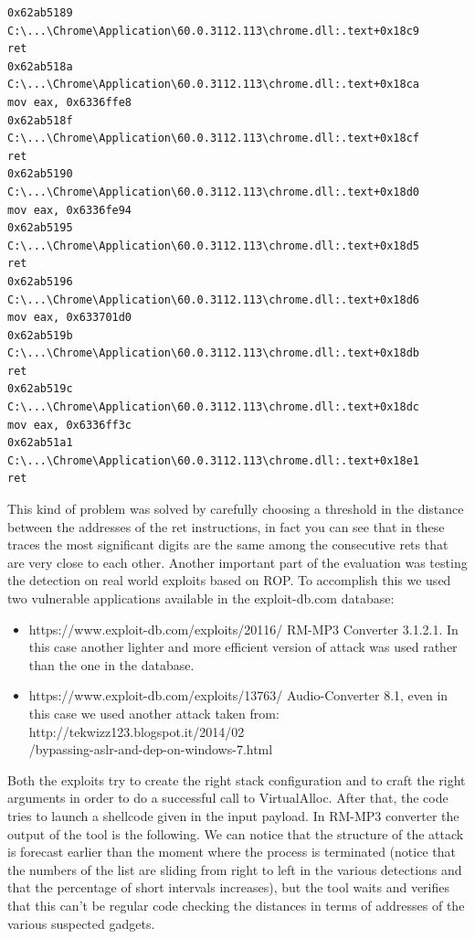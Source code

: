 \documentclass[Lau,binding=0.6cm]{sapthesis}
\begin{document}
\begin{verbatim}
0x62ab5189 C:\...\Chrome\Application\60.0.3112.113\chrome.dll:.text+0x18c9        ret 
0x62ab518a C:\...\Chrome\Application\60.0.3112.113\chrome.dll:.text+0x18ca        mov eax, 0x6336ffe8
0x62ab518f C:\...\Chrome\Application\60.0.3112.113\chrome.dll:.text+0x18cf        ret 
0x62ab5190 C:\...\Chrome\Application\60.0.3112.113\chrome.dll:.text+0x18d0        mov eax, 0x6336fe94
0x62ab5195 C:\...\Chrome\Application\60.0.3112.113\chrome.dll:.text+0x18d5        ret 
0x62ab5196 C:\...\Chrome\Application\60.0.3112.113\chrome.dll:.text+0x18d6        mov eax, 0x633701d0
0x62ab519b C:\...\Chrome\Application\60.0.3112.113\chrome.dll:.text+0x18db        ret 
0x62ab519c C:\...\Chrome\Application\60.0.3112.113\chrome.dll:.text+0x18dc        mov eax, 0x6336ff3c
0x62ab51a1 C:\...\Chrome\Application\60.0.3112.113\chrome.dll:.text+0x18e1        ret 

\end{verbatim}
\endgroup

This kind of problem was solved by carefully choosing a threshold in the distance between the addresses of the ret instructions, in fact you can see that in these traces the most significant digits are the same among the consecutive rets that are very close to each other.
Another important part of the evaluation was testing the detection on real world exploits based on ROP. To accomplish this we used two vulnerable applications available in the exploit-db.com database:
\begin{itemize}
\item
https://www.exploit-db.com/exploits/20116/ RM-MP3 Converter 3.1.2.1. In this case another lighter and more efficient version of attack was used rather than the one in the database.
\item
https://www.exploit-db.com/exploits/13763/ Audio-Converter 8.1, even in this case we used another attack taken from: http://tekwizz123.blogspot.it/2014/02\\ /bypassing-aslr-and-dep-on-windows-7.html
\end{itemize}
Both the exploits try to create the right stack configuration and to craft the right arguments in order to do a successful call to VirtualAlloc. After that, the code tries to launch a shellcode given in the input payload. 
In RM-MP3 converter the output of the tool is the following. We can notice that the structure of the attack is forecast earlier than the moment where the process is terminated (notice that the numbers of the list are sliding from right to left in the various detections and that the percentage of short intervals increases), but the tool waits and verifies that this can’t be regular code checking the distances in terms of addresses of the various suspected gadgets.
\end{document}

